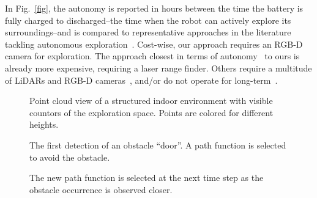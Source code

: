 \documentclass[lettersize,journal,twoside]{IEEEtran}
\theoremstyle{definition}
\begin{document}
In Fig.~\ref{fig}, the autonomy is reported in hours between the time the battery is fully charged to discharged--the time when the robot can actively explore its surroundings--and is compared to representative approaches in the literature tackling autonomous exploration~\cite{schmid2020efficient,kulkarni2022autonomous,muller2021openbot,tranzatto2022cerberus,roucek2020darpa,surmann2003autonomous}.
Cost-wise, our approach requires an RGB-D camera for exploration. The approach closest in terms of autonomy~\cite{surmann2003autonomous} to ours is already more expensive, requiring a laser range finder. Others require a multitude of LiDARs and RGB-D cameras~\cite{tranzatto2022cerberus,kulkarni2022autonomous,roucek2020darpa}, and/or do not operate for long-term~\cite{schmid2020efficient,muller2021openbot}.

\begin{figure*}[b]
  \vspace*{-.1cm}
  \begin{subfigure}[m]{0.48\textwidth}
    \centering
    \hspace*{-1.2cm}
    
    \caption{Point cloud view of a structured indoor environment with visible countors of the exploration space. Points are colored for different heights.}
    \label{fig:1-3}
  \end{subfigure}
  \hfill
  \begin{subfigure}[m]{0.25\textwidth}
    \centering
    
    \caption{The first detection of an obstacle ``door''. A path function is selected to avoid the obstacle.}
    \vspace*{-.7cm}
    \label{fig:1-1}
  \end{subfigure}
  \hfill
  \begin{subfigure}[m]{0.25\textwidth}
    \centering
    
    \caption{The new path function is selected at the next time step as the obstacle occurrence is observed closer.}
    \vspace*{-.7cm}
    \label{fig:1-2}
  \end{subfigure}
  \caption{Experimental results are reported for a structured indoor environment, a university hall composed of four connected corridors for a total length of approx. eighty meters. The view includes the point cloud in Fig.~\ref{fig:1-3} and the detail of the algorithm for obstacle avoidance and detection at successive time steps in Fig.~\ref{fig:1-1}~and~\ref{fig:1-2}. The points in the point cloud are filtered to report one point every two hundred and fifty. The colors of the spheres in Fig.~\ref{fig:1-1}--\ref{fig:1-2} indicate the proximity of an obstacle (orange indicates close proximity) and arrows the path-following vector field in Eq.~(\ref{eq:pfvf}). Robot's actual trajectory is in red and red dots indicate SLAM's registration points.}
  \label{fig:1}
\end{figure*}
\end{document}
